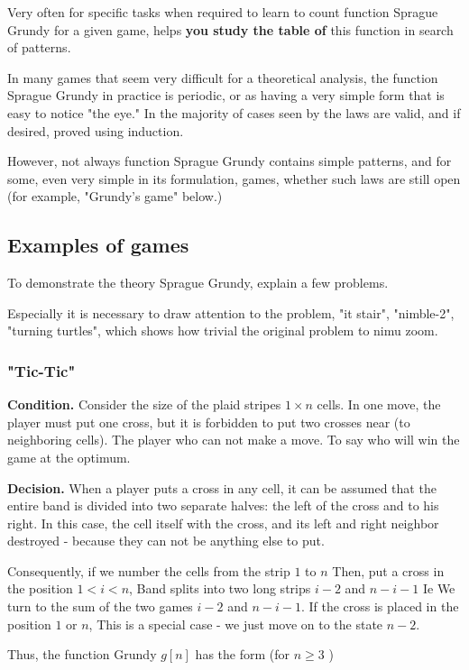 Very often for specific tasks when required to learn to count function Sprague Grundy for a given game, helps \textbf{you study the table of} this function in search of patterns.

In many games that seem very difficult for a theoretical analysis, the function Sprague Grundy in practice is periodic, or as having a very simple form that is easy to notice "the eye." In the majority of cases seen by the laws are valid, and if desired, proved using induction.

However, not always function Sprague Grundy contains simple patterns, and for some, even very simple in its formulation, games, whether such laws are still open (for example, "Grundy's game" below.)

\subsection{ Examples of games }

To demonstrate the theory Sprague Grundy, explain a few problems.

Especially it is necessary to draw attention to the problem, "it stair", "nimble-2", "turning turtles", which shows how trivial the original problem to nimu zoom.

\subsubsection{ "Tic-Tic" }

\textbf{Condition.} Consider the size of the plaid stripes $1 \times n$ cells. In one move, the player must put one cross, but it is forbidden to put two crosses near (to neighboring cells). The player who can not make a move. To say who will win the game at the optimum.

\textbf{Decision.} When a player puts a cross in any cell, it can be assumed that the entire band is divided into two separate halves: the left of the cross and to his right. In this case, the cell itself with the cross, and its left and right neighbor destroyed - because they can not be anything else to put.

Consequently, if we number the cells from the strip $1$ to $n$ Then, put a cross in the position $1 <i <n$, Band splits into two long strips $i-2$ and $n-i-1$ Ie We turn to the sum of the two games $i-2$ and $n-i-1$. If the cross is placed in the position $1$ or $n$, This is a special case - we just move on to the state $n-2$.

Thus, the function Grundy $g [n]$ has the form (for $n \ge 3$ )

